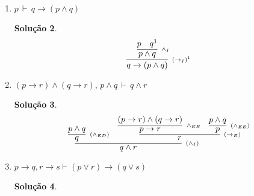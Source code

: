 \documentclass[11pt,a4paper]{report}
\newtheorem*{Solucao}{Solu\c{c}\~ao}
\begin{document}
\begin{enumerate}
\begin{enumerate}
\begin{Solucao}
\[{{{{                                                            q
                                                          }
                                               }
                                     }
                          }
                  \]
                \end{Solucao}
		\item $p\,\vdash\, q\rightarrow(p\land q)$
                  \begin{Solucao}
                    \[
                    \infer[\scriptstyle{(\to_I)}^1]
                             {q \to (p \land q)}
                             {
                               \infer[\scriptstyle{\land_I}]
                                        {p\land q}
                                        {p & q^1}
                             }
                    \]
                  \end{Solucao}
		\item $(p\rightarrow r)\land (q\rightarrow r),\,
                  p\land q\,\vdash\, q\land r$
                  \begin{Solucao}
                    \verb| |\\
                    \[
                    \infer[\scriptstyle{(\land_I)}]
                             {q \land r}
                             {
                               \infer[\scriptstyle{(\land_{ED})}]
                                        {q}
                                        {p\land q}
                                &
                                \infer[\scriptstyle{(\to_{E})}]
                                         {r}
                                         {
                                           \infer[\scriptstyle{\land_{EE}}]
                                                    {p \to r}
                                                    {(p \to r) \land
                                                      (q \to r)}
                                            &
                                            \infer[\scriptstyle{(\land_{EE})}]
                                                     {p}
                                                     {p\land q}
                                         }
                             }
                    \]
                  \end{Solucao}
		\item $p\rightarrow q, r\rightarrow s\vdash (p\lor
                  r)\rightarrow (q\lor s)$
                  \begin{Solucao}

\end{Solucao}
\end{enumerate}
\end{enumerate}
\end{document}
